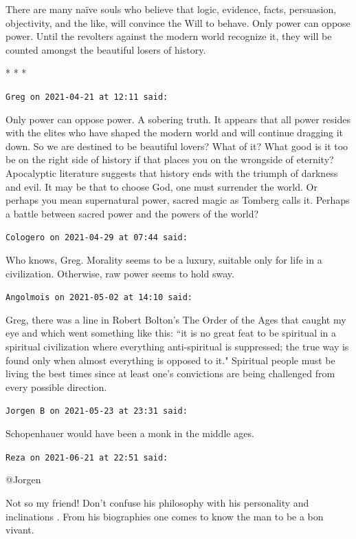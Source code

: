 There are many naïve souls who believe that logic, evidence, facts, persuasion, objectivity, and the like, will convince the Will to behave. Only power can oppose power. Until the revolters against the modern world recognize it, they will be counted amongst the beautiful losers of history.




\begin{center}* * *\end{center}

\begin{footnotesize}\begin{sffamily}



\texttt{Greg on 2021-04-21 at 12:11 said: }

Only power can oppose power. A sobering truth. It appears that all power resides with the elites who have shaped the modern world and will continue dragging it down. So we are destined to be beautiful lovers? What of it? What good is it too be on the right side of history if that places you on the wrongside of eternity?Apocalyptic literature suggests that history ends with the triumph of darkness and evil. It may be that to choose God, one must surrender the world. Or perhaps you mean supernatural power, sacred magic as Tomberg calls it. Perhaps a battle between sacred power and the powers of the world?


\hfill

\texttt{Cologero on 2021-04-29 at 07:44 said: }

Who knows, Greg. Morality seems to be a luxury, suitable only for life in a civilization. Otherwise, raw power seems to hold sway.


\hfill

\texttt{Angolmois on 2021-05-02 at 14:10 said: }

Greg, there was a line in Robert Bolton's The Order of the Ages that caught my eye and which went something like this: ``it is no great feat to be spiritual in a spiritual civilization where everything anti-spiritual is suppressed; the true way is found only when almost everything is opposed to it." Spiritual people must be living the best times since at least one's convictions are being challenged from every possible direction.


\hfill

\texttt{Jorgen B on 2021-05-23 at 23:31 said: }

Schopenhauer would have been a monk in the middle ages.


\hfill

\texttt{Reza on 2021-06-21 at 22:51 said: }

@Jorgen

Not so my friend! Don't confuse his philosophy with his personality and inclinations . From his biographies one comes to know the man to be a bon vivant.


\end{sffamily}\end{footnotesize}
